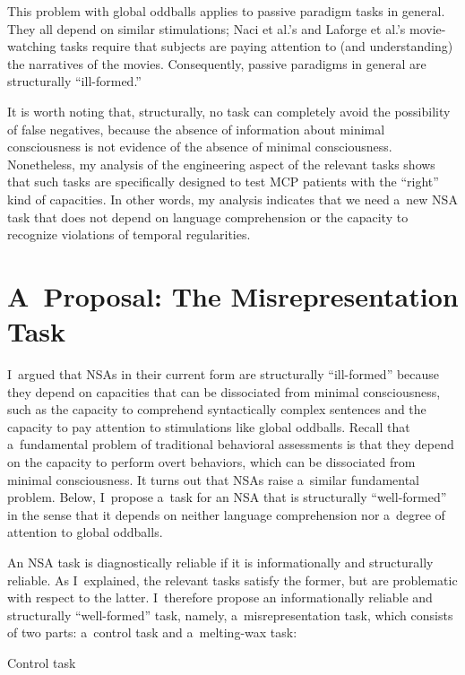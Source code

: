 This problem with global oddballs applies to passive paradigm tasks in general. They all depend on similar stimulations; Naci et al.'s
\parencite*[][]{naci_common_2014} %
 and Laforge et al.'s 
\parencite*[][]{cohen_distinguishing_2020} %
 movie-watching tasks require that subjects are paying attention to (and understanding) the narratives of the movies. Consequently, passive paradigms in general are structurally ``ill-formed.''

It is worth noting that, structurally, no task can completely avoid the possibility of false negatives, because the absence of information about minimal consciousness is not evidence of the absence of minimal consciousness. Nonetheless, my analysis of the engineering aspect of the relevant tasks shows that such tasks are specifically designed to test MCP patients with the ``right'' kind of capacities. In other words, my analysis indicates that we need a~new NSA task that does not depend on language comprehension or the capacity to recognize violations of temporal regularities.

\section{A~Proposal: The Misrepresentation Task}
I~argued that NSAs in their current form are structurally ``ill-formed'' because they depend on capacities that can be dissociated from minimal consciousness, such as the capacity to comprehend syntactically complex sentences and the capacity to pay attention to stimulations like global oddballs. Recall that a~fundamental problem of traditional behavioral assessments is that they depend on the capacity to perform overt behaviors, which can be dissociated from minimal consciousness. It turns out that NSAs raise a~similar fundamental problem. Below, I~propose a~task for an NSA that is structurally ``well-formed'' in the sense that it depends on neither language comprehension nor a~degree of attention to global oddballs.

An NSA task is diagnostically reliable if it is informationally and structurally reliable. As I~explained, the relevant tasks satisfy the former, but are problematic with respect to the latter. I~therefore propose an informationally reliable and structurally ``well-formed'' task, namely, a~misrepresentation task, which consists of two parts: a~control task and a~melting-wax task:

Control task


